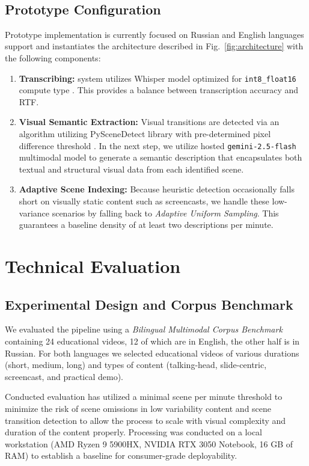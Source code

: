 ﻿﻿\documentclass[conference]{IEEEtran}
\begin{document}
\subsection{Prototype Configuration}
Prototype implementation is currently focused on Russian and English languages support and instantiates the architecture described in Fig.~\ref{fig:architecture} with the following components:
\begin{enumerate}
\item \textbf{Transcribing:} system utilizes Whisper model optimized for \texttt{int8\_float16} compute type \cite{Radford2022}. This provides a balance between transcription accuracy and RTF.
\item \textbf{Visual Semantic Extraction:} Visual transitions are detected via an algorithm utilizing PySceneDetect library with pre-determined pixel difference threshold \cite{PySceneDetect}. In the next step, we utilize hosted \texttt{gemini-2.5-flash} multimodal model \cite{GeminiTeam2025} to generate a semantic description that encapsulates both textual and structural visual data from each identified scene.
\item \textbf{Adaptive Scene Indexing:} Because heuristic detection occasionally falls short on visually static content such as screencasts, we handle these low-variance scenarios by falling back to \emph{Adaptive Uniform Sampling}. This guarantees a baseline density of at least two descriptions per minute.
\end{enumerate}

\section{Technical Evaluation}
\subsection{Experimental Design and Corpus Benchmark}
We evaluated the pipeline using a  \emph{Bilingual Multimodal Corpus Benchmark} containing 24 educational videos, 12 of which are in English, the other half is in Russian. For both languages we selected educational videos of various durations (short, medium, long) and types of content (talking-head, slide-centric, screencast, and practical demo).

Conducted evaluation has utilized a minimal scene per minute threshold to minimize the risk of scene omissions in low variability content and scene transition detection to allow the process to scale with visual complexity and duration of the content properly. Processing was conducted on a local workstation (AMD Ryzen 9 5900HX,
NVIDIA RTX 3050 Notebook, 16 GB of RAM) to establish a baseline for consumer-grade deployability.
\end{document}
